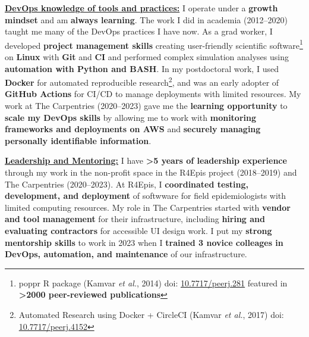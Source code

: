\underline{\textbf{DevOps knowledge of tools and practices:}}
I operate under a \textbf{growth mindset} and am \textbf{always learning}.
The work I did in academia (2012--2020) taught me many of the DevOps practices I have now.
As a grad worker, I developed \textbf{project management skills} creating user-friendly scientific software\footnote{poppr R package (Kamvar \textit{et al.}, 2014) doi: \href{https://doi.org/10.7717/peerj.281}{10.7717/peerj.281} featured in \textbf{\textgreater2000 peer-reviewed publications}} on \textbf{Linux} with \textbf{Git} and \textbf{CI} and 
performed complex simulation analyses using \textbf{automation with Python and BASH}.
In my postdoctoral work, I used \textbf{Docker} for automated reproducible research\footnote{Automated Research using Docker + CircleCI (Kamvar \textit{et al.}, 2017) doi: \href{https://doi.org/10.7717/peerj.4152}{10.7717/peerj.4152}}, 
and was an early adopter of \textbf{GitHub Actions} for CI/CD to manage deployments with limited resources.
My work at The Carpentries (2020--2023) gave me the \textbf{learning opportunity} to \textbf{scale my DevOps skills} by allowing me to work with \textbf{monitoring frameworks and deployments on AWS} and \textbf{securely managing personally identifiable information}. 





\vspace{2ex}

\underline{\textbf{Leadership and Mentoring:}}
I have \textbf{\textgreater5 years of leadership experience} through my work in the non-profit space in the R4Epis project (2018--2019) and The Carpentries (2020--2023).
At R4Epis, I \textbf{coordinated testing, development, and deployment} of softwware for field epidemiologists with limited computing resources.
My role in The Carpentries started with \textbf{vendor and tool management} for their infrastructure, including \textbf{hiring and evaluating contractors} for accessible UI design work.
I put my \textbf{strong mentorship skills} to work in 2023 when I \textbf{trained 3 novice colleages in DevOps, automation, and maintenance} of our infrastructure.

